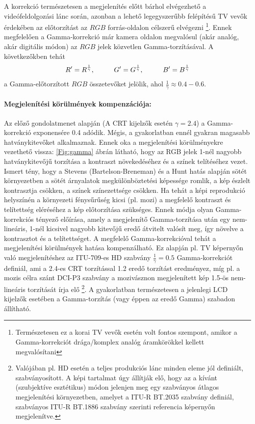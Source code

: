 A korrekció természetesen a megjelenítés előtt bárhol elvégezhető a videófeldolgozási lánc során, azonban a lehető legegyszerűbb felépítésű TV vevők érdekében az előtorzítást az $RGB$ forrás-oldalon célszerű elvégezni \footnote{Természetesen ez a korai TV vevők esetén volt fontos szempont, amikor a Gamma-korrekciót drága/komplex analóg áramkörökkel kellett megvalósítani}.
Ennek megfelelően a Gamma-korrekció már kamera oldalon megvalósul (akár analóg, akár digitális módon) az $RGB$ jelek közvetlen Gamma-torzításával.
A következőkben tehát
\begin{align*}
\begin{split}
R' = R^{\frac{1}{\gamma}}, \hspace{10mm} 
G' = G^{\frac{1}{\gamma}}, \hspace{10mm}
B' = B^{\frac{1}{\gamma}}
\end{split}
\end{align*}
a Gamma-előtorzított $RGB$ összetevőket jelölik, ahol $\frac{1}{\gamma} \approx 0.4-0.6$.

\paragraph{Megjelenítési körülmények kompenzációja:\\}
Az előző gondolatmenet alapján (A CRT kijelzők esetén $\gamma = 2.4$) a Gamma-korrekció exponensére 0.4 adódik.
Mégis, a gyakorlatban ennél gyakran magasabb hatványkitevőket alkalmaznak.
Ennek oka a megjelenítési körülményekre vezethető vissza: \ref{Fig:gamma} ábrán látható, hogy az RGB jelek 1-nél nagyobb hatványkitevőjű torzítása a kontraszt növekedéséhez és a színek telítéséhez vezet.
Ismert tény, hogy a Stevens (Bartelson-Breneman) és a Hunt hatás alapján sötét környezetben a sötét árnyalatok megkülönböztetési képessége romlik, a kép észlelt kontrasztja csökken, a színek színezettsége csökken.
Ha tehát a képi reprodukció helyszínén a környezeti fénysűrűség kicsi (pl. mozi) a megfelelő kontraszt és telítettség eléréséhez a kép előtorzítása szükséges.
Ennek módja olyan Gamma-korrekciós tényező előírása, amely a megjelenítő Gamma-torzítása után egy nem-lineáris, 1-nél kicsivel nagyobb kitevőjű eredő átvitelt valósít meg, így növelve a kontrasztot és a telítettséget.
A megfelelő Gamma-korrekcióval tehát a megjelenítési körülmények hatása kompenzálható.
Ez alapján pl. TV képernyőn való megjelenítéshez az ITU-709-es HD szabvány $\frac{1}{\gamma} = 0.5$ Gamma-korrekciót definiál, ami a 2.4-es CRT torzítással 1.2 eredő torzítást eredményez, míg pl. a mozis célra szánt DCI-P3 szabvány a mozivásznon megjelenített kép 1.5-ös nem-lineáris torzítását írja elő \footnote{Valójában pl. HD esetén a teljes produkciós lánc minden eleme jól definiált, szabványosított.
A képi tartalmat úgy állítják elő, hogy az a kívánt (szubjektíve esztétikus) módon jelenjen meg egy szabványos átlagos megjelenítési környezetben, amelyet a ITU-R BT.2035 szabvány definiál, szabványos ITU-R BT.1886 szabvány szerinti referencia képernyőn megjelenítve.}.
A gyakorlatban természetesen a jelenlegi LCD kijelzők esetében a Gamma-torzítás (vagy éppen az eredő Gamma) szabadon állítható.

